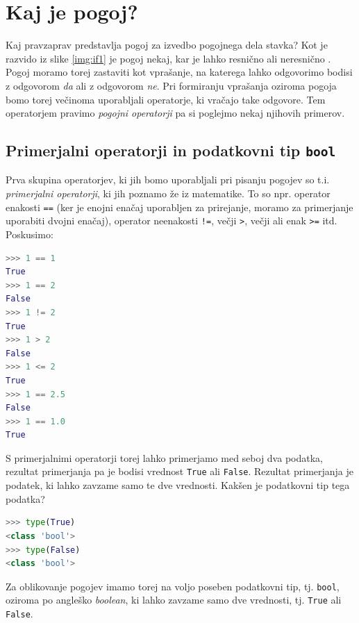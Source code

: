 \section{Kaj je pogoj?}

Kaj pravzaprav predstavlja pogoj za izvedbo pogojnega dela stavka? Kot je razvido iz slike \ref{img:if1} je pogoj nekaj, kar je lahko resnično  ali neresnično . Pogoj moramo torej zastaviti kot vprašanje, na katerega lahko odgovorimo bodisi z odgovorom \emph{da} ali z odgovorom \emph{ne}. Pri formiranju vprašanja oziroma pogoja bomo torej večinoma uporabljali operatorje, ki vračajo take odgovore. Tem operatorjem pravimo \emph{pogojni operatorji} pa si poglejmo nekaj njihovih primerov.

\subsection{Primerjalni operatorji in podatkovni tip \texttt{bool}}

Prva skupina operatorjev, ki jih bomo uporabljali pri pisanju pogojev so t.i. \emph{primerjalni operatorji}, ki jih poznamo že iz matematike. To so npr. operator enakosti \texttt{==} (ker je enojni enačaj uporabljen za prirejanje, moramo za primerjanje uporabiti dvojni enačaj), operator neenakosti \texttt{!=}, večji \texttt{>}, večji ali enak \texttt{>=} itd. Poskusimo:
\begin{lstlisting}[language=Python]
>>> 1 == 1
True
>>> 1 == 2
False
>>> 1 != 2
True
>>> 1 > 2
False
>>> 1 <= 2
True
>>> 1 == 2.5
False
>>> 1 == 1.0
True
\end{lstlisting}
S primerjalnimi operatorji torej lahko primerjamo med seboj dva podatka, rezultat primerjanja pa je bodisi vrednost \texttt{True} ali \texttt{False}. Rezultat primerjanja je podatek, ki lahko zavzame samo te dve vrednosti. Kakšen je podatkovni tip tega podatka?
\begin{lstlisting}[language=Python]
>>> type(True)
<class 'bool'>
>>> type(False)
<class 'bool'>
\end{lstlisting}
Za oblikovanje pogojev imamo torej na voljo poseben podatkovni tip, tj. \texttt{bool}, oziroma po angleško \emph{boolean}, ki lahko zavzame samo dve vrednosti, tj. \texttt{True} ali \texttt{False}. 

